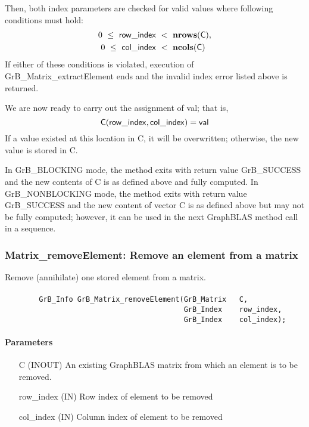 Then, both index parameters are checked for valid values where following
conditions must hold:
\[
\begin{aligned}
    0\ \leq\ {\sf row\_index} & \ <\ \mathbf{nrows}({\sf C}), \\
    0\ \leq\ {\sf col\_index} & \ <\ \mathbf{ncols}({\sf C})
\end{aligned}
\]
If either of these conditions is violated, execution of 
{\sf GrB\_Matrix\_extractElement} ends and the invalid 
index error listed above is returned. 

We are now ready to carry out the assignment of {\sf val}; that is,
\[
{\sf C}({\sf row\_index},{\sf col\_index}) = {\sf val} 
\]
If a value existed at this location in {\sf C}, it will be overwritten; otherwise,
the new value is stored in {\sf C}.

In {\sf GrB\_BLOCKING} mode, the method exits with return value 
{\sf GrB\_SUCCESS} and the new contents of {\sf C} is as defined above
and fully computed.  
In {\sf GrB\_NONBLOCKING} mode, the method exits with return value 
{\sf GrB\_SUCCESS} and the new content of vector {\sf C} is as defined above 
but may not be fully computed; however, it can be used in the next GraphBLAS 
method call in a sequence.


\subsubsection{{\sf Matrix\_removeElement}: Remove an element from a matrix}

Remove (annihilate) one stored element from a matrix.

\paragraph{\syntax}

\begin{verbatim}
        GrB_Info GrB_Matrix_removeElement(GrB_Matrix   C,
                                          GrB_Index    row_index,
                                          GrB_Index    col_index); 
\end{verbatim}

\paragraph{Parameters}

\begin{itemize}[leftmargin=1.1in]
    \item[{\sf C}]   ({\sf INOUT}) An existing GraphBLAS matrix from which an 
    element is to be removed.

    \item[{\sf row\_index}] ({\sf IN}) Row index of element to be removed
    \item[{\sf col\_index}] ({\sf IN}) Column index of element to be removed
\end{itemize}

